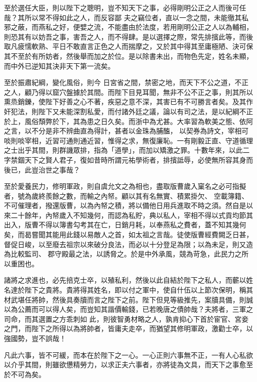 \begin{pinyinscope}
 至於選任大臣，則以陛下之聰明，豈不知天下之事，必得剛明公正之人而後可任哉？其所以常不得如此之人，而反容鄙
 夫之竊位者，直以一念之間，未能徹其私邪之蔽，而燕私之好，便嬖之流，不能盡由於法度，若用剛明公正之人以為輔相，則恐其有以妨吾之事，害吾之人，而不得肆。是以選擇之際，常先排擯此等，而後取凡疲懦軟熟、平日不敢直言正色之人而揣摩之，又於其中得其至庸極陋、決可保其不至於有所妨者，然後舉而加之於位。是以除書未出，而物色先定，姓名未顯，而中外已逆知其決非天下第一流矣。



 至於振肅紀綱，變化風俗，則今
 日宮省之間，禁密之地，而天下不公之道，不正之人，顧乃得以窟穴盤據於其間。而陛下目見耳聞，無非不公不正之事，則其所以熏烝銷鑠，使陛下好善之心不著，疾惡之意不深，其害已有不可勝言者矣。及其作奸犯法，則陛下又未能深割私愛，而付諸外廷之議，論以有司之法，是以紀綱不正於上，風俗頹弊於下，其為患之日久矣。而浙中為尤甚。大率習為軟美之態、依阿之言，以不分是非不辨曲直為得計，甚者以金珠為脯醢，
 以契券為詩文，宰相可啖則啖宰相，近習可通則通近習，惟得之求，無復廉恥。一有剛毅正直、守道循理之士出乎其間，則群譏眾排，指為「道學」，而加以矯激之罪。十數年來，以此二字禁錮天下之賢人君子，復如昔時所謂元祐學術者，排擯詆辱，必使無所容其身而後已，此豈治世之事哉？



 至於愛養民力，修明軍政，則自虞允文之為相也，盡取版曹歲入窠名之必可指擬者，號為歲終羨餘之數，而輸之內帑。顧以其有名無實、積累掛欠、
 空載簿籍、不可催理者，撥還版曹，以為內帑之積，將以備他日用兵進取不時之須。然自是以來二十餘年，內帑歲入不知幾何，而認為私貯，典以私人，宰相不得以式貢均節其出入，版曹不得以簿書勾考其在亡，日銷月耗，以奉燕私之費者，蓋不知其幾何矣，而曷嘗聞其能用此錢以易敵人之首，如太祖之言哉。徒使版曹經費闕乏日甚，督促日峻，以至廢去祖宗以來破分良法，而必以十分登足為限；以為未足，則又造為比較監司、
 郡守殿最之法，以誘脅之。於是中外承風，競為苛急，此民力之所以重困也。



 諸將之求進也，必先掊克士卒，以殖私利，然後以此自結於陛下之私人，而蘄以姓名達於陛下之貴將。貴將得其姓名，即以付之軍中，使自什伍以上節次保明，稱其材武堪任將帥，然後具奏牘而言之陛下之前。陛下但見等級推先，案牘具備，則誠以為公薦而可以得人矣，而豈知其諧價輸錢，已若晚唐之債帥哉？夫將者，三軍之司命，而其選置之方乖刺如
 此，則彼智勇材略之人，孰肯抑心下首於宦官、宮妾之門，而陛下之所得以為將帥者，皆庸夫走卒，而猶望其修明軍政，激勸士卒，以強國勢，豈不誤哉！



 凡此六事，皆不可緩，而本在於陛下之一心。一心正則六事無不正，一有人心私欲以介乎其間，則雖欲憊精勞力，以求正夫六事者，亦將徒為文具，而天下之事愈至於不可為矣。




\end{pinyinscope}
